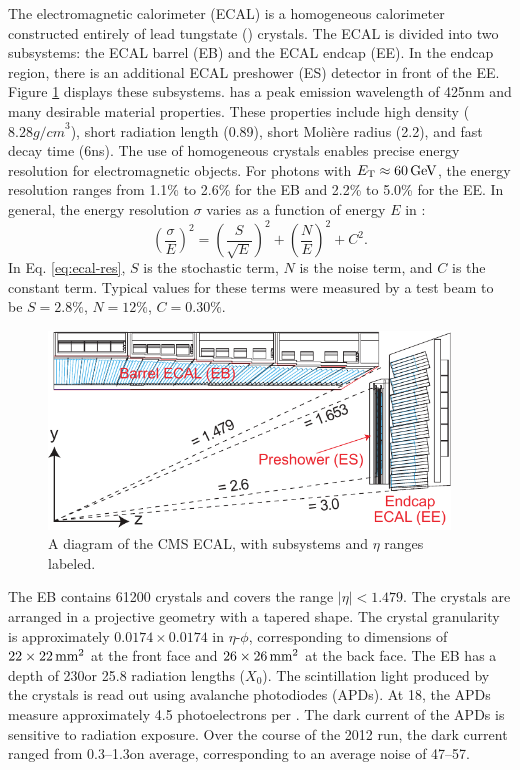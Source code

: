 The electromagnetic calorimeter (ECAL) is a homogeneous calorimeter constructed entirely of lead tungstate (\pbwo) crystals. The ECAL is divided into two subsystems: the ECAL barrel (EB) and the ECAL endcap (EE). In the endcap region, there is an additional ECAL preshower (ES) detector in front of the EE. Figure \ref{fig:ecal-layout} displays these subsystems. \pbwo has a peak emission wavelength of 425\unit{nm} and many desirable material properties. These properties include high density ($8.28\unit{g/cm}^3$), short radiation length (0.89\cm), short Moli\`{e}re radius (2.2\cm), and fast decay time (6\unit{ns}). The use of homogeneous \pbwo crystals enables precise energy resolution for electromagnetic objects. For photons with ${E}_{\mathrm{T}} \approx 60\,\text{Ge\hspace{-.08em}V}$, the energy resolution ranges from 1.1\% to 2.6\% for the EB and 2.2\% to 5.0\% for the EE. In general, the energy resolution $\sigma$ varies as a function of energy $E$ in \GeVns:
\begin{equation}
\label{eq:ecal-res} \left(\frac{\sigma}{E}\right)^{2} = \left(\frac{S}{\sqrt{E}}\right)^{2} + \left(\frac{N}{E}\right)^{2} + C^{2}.
\end{equation}
In Eq. \eqref{eq:ecal-res}, $S$ is the stochastic term, $N$ is the noise term, and $C$ is the constant term. Typical values for these terms were measured by a test beam to be $S=2.8\%$, $N=12\%$, $C=0.30\%$.

\begin{figure}[hbt]
\begin{center}
\includegraphics[width=0.95\textwidth]{figures/ECAL_transverse_section.pdf}
\caption{A diagram of the CMS ECAL, with subsystems and $\eta$ ranges labeled.}
\label{fig:ecal-layout}
\end{center}
\end{figure}

The EB contains 61200 \pbwo crystals and covers the range $|\eta|<1.479$. The crystals are arranged in a projective geometry with a tapered shape. The crystal granularity is approximately $0.0174\times0.0174$ in $\eta$-$\phi$, corresponding to dimensions of $22\times22\,\text{mm}^{2}$ at the front face and $26\times26\,\text{mm}^{2}$ at the back face. The EB has a depth of 230\mm or 25.8 radiation lengths ($X_{0}$). The scintillation light produced by the \pbwo crystals is read out using avalanche photodiodes (APDs). At 18\degC, the APDs measure approximately 4.5 photoelectrons per \MeVns. The dark current of the APDs is sensitive to radiation exposure. Over the course of the 2012 run, the dark current ranged from 0.3--1.3\muA on average, corresponding to an average noise of 47--57\MeV \cite{CMS:2013ecal}.

